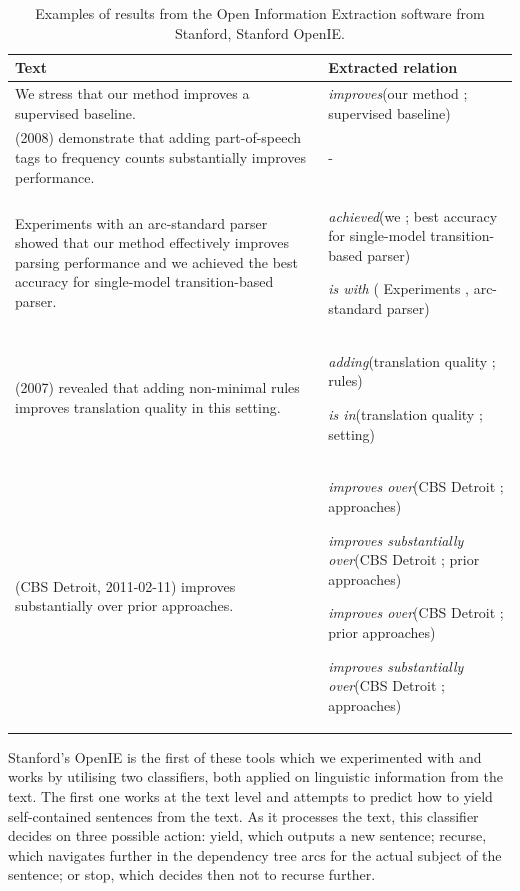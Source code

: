\documentclass[11pt,a4paper,openright]{memoir}
\begin{document}
\begin{table}[!htbp]
  \centering
  \tiny
    \begin{tabular}{|m{6cm}|m{5cm}|}
      \hline
      \textbf{Text}             & \textbf{Extracted relation} \\
      \hline
      We stress that our method improves a supervised baseline.      & \emph{improves}(our method ; supervised baseline)          \\
      \hline
      (2008) demonstrate that adding part-of-speech tags to frequency counts substantially improves performance.
& -          \\
      \hline
      Experiments with an arc-standard parser showed that our method effectively improves parsing performance and we achieved the best accuracy for single-model transition-based parser.
&
\emph{achieved}(we ; best accuracy for single-model transition-based parser)

\emph{is with} ( Experiments , arc-standard parser)\\
      \hline
      (2007) revealed that adding non-minimal rules improves translation quality in this setting.
&
\emph{adding}(translation quality ; rules)

\emph{is in}(translation quality ; setting)
\\
      \hline
      (CBS Detroit, 2011-02-11) improves substantially over prior approaches.
&

\emph{improves over}(CBS Detroit ; approaches)

\emph{improves substantially over}(CBS Detroit ; prior approaches)

\emph{improves over}(CBS Detroit ; prior approaches)

\emph{improves substantially over}(CBS Detroit ; approaches)

\\
      \hline
    \end{tabular}
  \caption[Examples of results from the Open Information Extraction.]{Examples of results from the Open Information Extraction software from Stanford, Stanford OpenIE.}
  \label{tab:extractions_from_open_ie}
\end{table}

Stanford's OpenIE \cite{angeli-johnsonpremkumar-manning:2015:ACL-IJCNLP} is the first of these tools which we experimented with and works by utilising two classifiers, both applied on linguistic information from the text. The first one works at the text level and attempts to predict how to yield self-contained sentences from the text. As it processes the text, this classifier decides on three possible action: yield, which outputs a new sentence; recurse, which navigates further in the dependency tree arcs for the actual subject of the sentence; or stop, which decides then not to recurse further.
\end{document}
